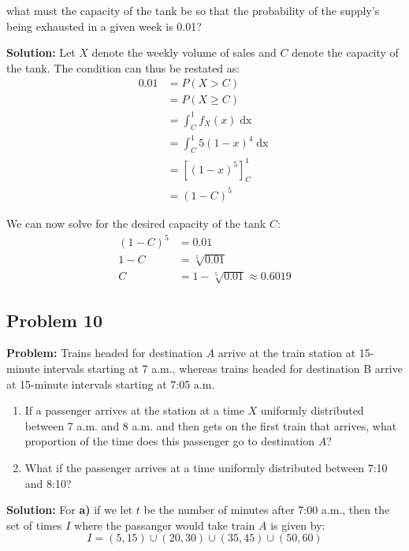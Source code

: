 \documentclass{article}
\newcommand*\eval[3]{\left[#1\right]_{#2}^{#3}}
\begin{document}
what must the capacity of the tank be so that the probability of the supply’s being exhausted in a given week is 0.01?
\bigskip

\noindent\textbf{Solution:} Let $X$ denote the weekly volume of sales and $C$ denote the capacity of the tank. The condition can thus be restated as:
\begin{align*}
    0.01&=P(X>C)\\
    &=P(X\ge C)\tag{continuous distribution}\\
    &=\int_C^1 f_X(x)\mathop{dx}\\
    &=\int_C^1 5(1-x)^4\mathop{dx}\\
    &=\eval{(1-x)^5}{C}{1}\\
    &=(1-C)^5
\end{align*}

We can now solve for the desired capacity of the tank $C$:
\begin{align*}
    (1-C)^5&=0.01\\
    1-C&=\sqrt[5]{0.01}\\
    C&=1-\sqrt[5]{0.01}\approx0.6019
\end{align*}

\subsection*{Problem 10}
\noindent\textbf{Problem:} Trains headed for destination $A$ arrive at the train station at 15-minute intervals starting at 7 a.m., whereas trains headed for destination B arrive at 15-minute intervals starting at 7:05 a.m.
\begin{enumerate}[label=\textbf{\alph*)}]
    \item If a passenger arrives at the station at a time $X$ uniformly distributed between 7 a.m. and 8 a.m. and then gets on the first train that arrives, what proportion of the time does this passenger go to destination $A$?
    \item What if the passenger arrives at a time uniformly distributed between 7:10 and 8:10?
\end{enumerate}
\bigskip

\noindent\textbf{Solution:} For \textbf{a)} if we let $t$ be the number of minutes after 7:00 a.m., then the set of times $I$ where the passanger would take train $A$ is given by:
\begin{equation*}
    I=(5,15)\cup(20,30)\cup(35,45)\cup(50,60)
\end{equation*}
\end{document}
